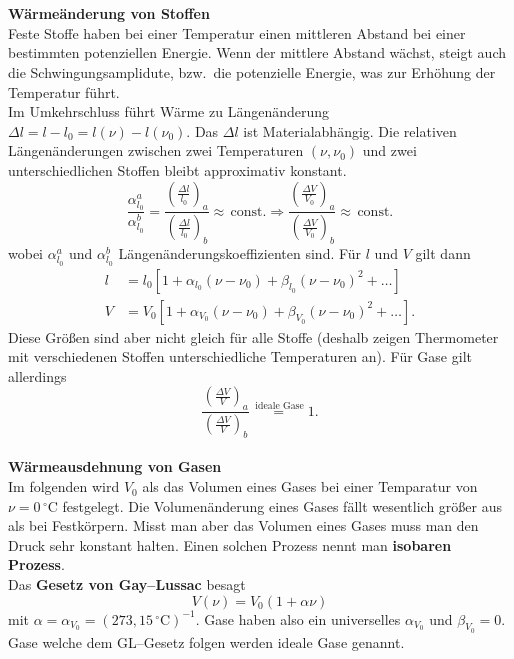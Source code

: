 \documentclass[a4paper,12pt]{article}
\begin{document}
\\\hfill\\\textbf{Wärmeänderung von Stoffen}\\ 
Feste Stoffe haben bei einer Temperatur einen mittleren Abstand bei einer bestimmten potenziellen Energie. Wenn der mittlere Abstand wächst, steigt auch die Schwingungsamplidute, bzw.\, die potenzielle Energie, was zur Erhöhung der Temperatur führt.\\\indent
Im Umkehrschluss führt Wärme zu Längenänderung $\Delta l=l-l_0=l\left(\nu \right)-l\left(\nu _0\right)$. Das $\Delta l$ ist Materialabhängig. Die relativen Längenänderungen zwischen zwei Temperaturen $\left(\nu ,\nu _0\right)$ und zwei unterschiedlichen Stoffen bleibt approximativ konstant.
\[ 
        \dfrac{\alpha _{l_0}^a}{\alpha _{l_0}^b}=\dfrac{\left(\tfrac{\Delta l}{l_0}\right)_a}{\left(\tfrac{\Delta l}{l_0}\right)_b}\approx \,\text{const.}\Rightarrow \dfrac{\left(\tfrac{\Delta V}{V_0}\right)_a}{\left(\tfrac{\Delta V}{V_0}\right)_b}\approx \,\text{const.}
\] 
wobei $\alpha _{l_0}^a$ und $\alpha _{l_0}^b$ Längenänderungskoeffizienten sind. Für $l$ und $V$ gilt dann
\begin{align*}
        l&=l_0\left[1+\alpha _{l_0}\left(\nu -\nu _0\right)+\beta _{l_0}\left(\nu -\nu _0\right)^2+\hdots \right]\\
        V&=V_0\left[1+\alpha _{V_0}\left(\nu -\nu _0\right)+\beta _{V_0}\left(\nu -\nu _0\right)^2+\hdots \right]
.\end{align*}
Diese Größen sind aber nicht gleich für alle Stoffe (deshalb zeigen Thermometer mit verschiedenen Stoffen unterschiedliche Temperaturen an). Für Gase gilt allerdings
\[ 
        \dfrac{\left(\tfrac{\Delta V}{V}\right)_a}{\left(\tfrac{\Delta V}{V}\right)_b}\stackrel{\,\text{ideale Gase}}{=}1
.\] 
\hfill\\\textbf{Wärmeausdehnung von Gasen}\\ 
Im folgenden wird $V_0$ als das Volumen eines Gases bei einer Temparatur von $\nu =0\,\text{$^\circ$C}$ festgelegt. Die Volumenänderung eines Gases fällt wesentlich größer aus als bei Festkörpern. Misst man aber das Volumen eines Gases muss man den Druck sehr konstant halten. Einen solchen Prozess nennt man \textbf{isobaren Prozess}.\\\indent
Das \textbf{Gesetz von Gay--Lussac} besagt
\[ 
        V\left(\nu \right)=V_0\left(1+\alpha \nu \right)
\] 
mit $\alpha =\alpha _{V_0}=\left(273,15\,\text{$^\circ$C}\right)^{-1}$. Gase haben also ein universelles $\alpha _{V_0}$ und $\beta _{V_0}=0$. Gase welche dem GL--Gesetz folgen werden ideale Gase genannt.\\\indent
\end{document}
